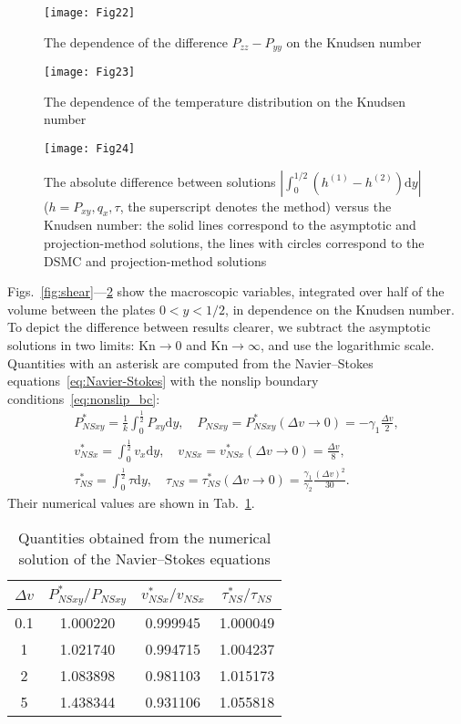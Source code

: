 \documentclass[aip,pof,preprint]{revtex4-1}
\newcommand{\Kn}{\mathrm{Kn}}
\newcommand{\NS}{N\!S}
\newcommand{\dd}{\mathrm{d}}
\begin{document}
\begin{figure}
    \centering
    \texttt{[image: Fig22]}
    \caption{The dependence of the difference \(P_{zz}-P_{yy}\) on the Knudsen number}
    \label{fig:pzz}
\end{figure}

\begin{figure}
    \centering
    \texttt{[image: Fig23]}
    \caption{The dependence of the temperature distribution on the Knudsen number}
    \label{fig:temp}
\end{figure}

\begin{figure}
    \centering
    \texttt{[image: Fig24]}
    \caption{The absolute difference between solutions \(|\int_0^{1/2} (h^{(1)}-h^{(2)})\dd{y}|\)
        (\(h = P_{xy}, q_x, \tau\), the superscript denotes the method) versus the Knudsen number:
        the solid lines correspond to the asymptotic and projection-method solutions,
        the lines with circles correspond to the DSMC and projection-method solutions}
    \label{fig:diff}
\end{figure}

Figs.~\ref{fig:shear}---\ref{fig:temp} show the macroscopic variables,
integrated over half of the volume between the plates \(0<y<1/2\), in dependence on the Knudsen number.
To depict the difference between results clearer,
we subtract the asymptotic solutions in two limits: \(\Kn\to0\) and \(\Kn\to\infty\),
and use the logarithmic scale.
Quantities with an asterisk are computed from the Navier--Stokes equations~\eqref{eq:Navier-Stokes}
with the nonslip boundary conditions~\eqref{eq:nonslip_bc}:
\begin{gather*}
    P_{\NS xy}^* = \frac1k \int_0^\frac12 P_{xy} \dd{y}, \quad P_{\NS xy} = P_{\NS xy}^*(\Delta{v}\to0) = -\gamma_1\frac{\Delta{v}}2, \\
    v_{\NS x}^* = \int_0^\frac12 v_x \dd{y}, \quad v_{\NS x} = v_{\NS x}^*(\Delta{v}\to0) = \frac{\Delta{v}}8, \\
    \tau_{\NS}^* = \int_0^\frac12 \tau \dd{y}, \quad
        \tau_{\NS} = \tau_{\NS}^*(\Delta{v}\to0) = \frac{\gamma_1}{\gamma_2}\frac{(\Delta{v})^2}{30}.
\end{gather*}
Their numerical values are shown in Tab.~\ref{table:NS_params}.

\begin{table}
    \centering
    \begin{tabular}{|c|c|c|c|}
        \hline
        \(\Delta{v}\) & \(\displaystyle P_{\NS xy}^*/P_{\NS xy}\) & \(\displaystyle v_{\NS x}^*/v_{\NS x}\) & \(\displaystyle \tau_{\NS}^*/\tau_{\NS}\) \\ \hline
        0.1 & 1.000220 & 0.999945 & 1.000049 \\ \hline
          1 & 1.021740 & 0.994715 & 1.004237 \\ \hline
          2 & 1.083898 & 0.981103 & 1.015173 \\ \hline
          5 & 1.438344 & 0.931106 & 1.055818 \\ \hline
    \end{tabular}
    \caption{Quantities obtained from the numerical solution of the Navier--Stokes equations}
    \label{table:NS_params}
\end{table}
\end{document}
